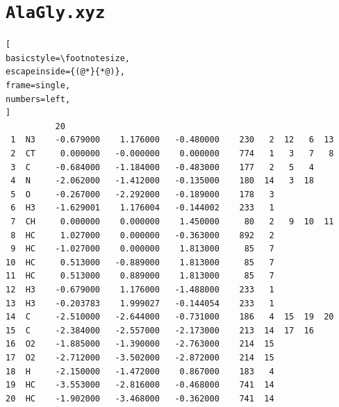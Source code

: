 \documentclass[a4paper,11pt]{scrartcl}
\begin{document}
\FloatBarrier
\newpage

\printacronyms[include-classes=abbrev,name=Abbreviations]

\newpage

\printbibliography

\newpage

\appendix
\section{\texttt{AlaGly.xyz}}
\label{app:alaglytinker}
\begin{lstlisting}[
basicstyle=\footnotesize,
escapeinside={(@*}{*@)},
frame=single,
numbers=left,
]
          20  
 1  N3    -0.679000    1.176000   -0.480000    230   2  12   6  13
 2  CT     0.000000   -0.000000    0.000000    774   1   3   7   8
 3  C     -0.684000   -1.184000   -0.483000    177   2   5   4
 4  N     -2.062000   -1.412000   -0.135000    180  14   3  18
 5  O     -0.267000   -2.292000   -0.189000    178   3
 6  H3    -1.629001    1.176004   -0.144002    233   1
 7  CH     0.000000    0.000000    1.450000     80   2   9  10  11
 8  HC     1.027000    0.000000   -0.363000    892   2
 9  HC    -1.027000    0.000000    1.813000     85   7
10  HC     0.513000   -0.889000    1.813000     85   7
11  HC     0.513000    0.889000    1.813000     85   7
12  H3    -0.679000    1.176000   -1.488000    233   1
13  H3    -0.203783    1.999027   -0.144054    233   1
14  C     -2.510000   -2.644000   -0.731000    186   4  15  19  20
15  C     -2.384000   -2.557000   -2.173000    213  14  17  16
16  O2    -1.885000   -1.390000   -2.763000    214  15
17  O2    -2.712000   -3.502000   -2.872000    214  15
18  H     -2.150000   -1.472000    0.867000    183   4
19  HC    -3.553000   -2.816000   -0.468000    741  14
20  HC    -1.902000   -3.468000   -0.362000    741  14
\end{lstlisting}
\end{document}
